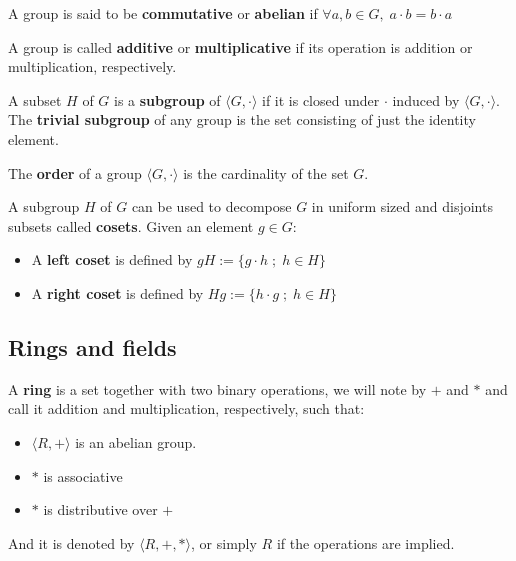 \documentclass[a4paper,12pt]{article}
\begin{document}
\begin{definition}
  A group is said to be \textbf{commutative} or \textbf{abelian}
  if $\forall a, b \in G, \; a\cdot b = b\cdot a$
\end{definition}

\noindent
A group is called \textbf{additive} or \textbf{multiplicative} if its
operation is addition or multiplication, respectively.

\begin{definition}
  A subset $H$ of $G$ is a \textbf{subgroup} of $\langle G,\cdot \rangle$ if it is
  closed under $\cdot$ induced by $\langle G,\cdot \rangle$. The \textbf{trivial subgroup} of any
  group is the set consisting of just the identity element.
\end{definition}

\begin{definition}
  The \textbf{order} of a group $\langle G,\cdot\rangle$ is the cardinality of the set $G$.
\end{definition}

\begin{definition}
  A subgroup $H$ of $G$ can be used to decompose $G$ in uniform sized and
  disjoints subsets called \textbf{cosets}. Given an element $g \in G$:
  \begin{itemize}
  \item A \textbf{left coset} is defined by $gH := \{g\cdot h \; ; \; h \in H\}$
  \item A \textbf{right coset} is defined by $Hg := \{h\cdot g \; ; \; h \in H\}$
  \end{itemize}
\end{definition}

\subsection{Rings and fields}
\label{sec:org4217bf2}

   \begin{definition}
  A \textbf{ring} is a set together with two binary operations, we will note by
  $+$ and $*$ and call it addition and multiplication, respectively, such that:
  \begin{itemize}
  \item $\langle R,+\rangle$ is an abelian group.
  \item $*$ is associative
  \item $*$ is distributive over $+$
  \end{itemize}

  And it is denoted by $\langle R,+,*\rangle$, or simply $R$ if the operations are implied.
\end{definition}
\end{document}
